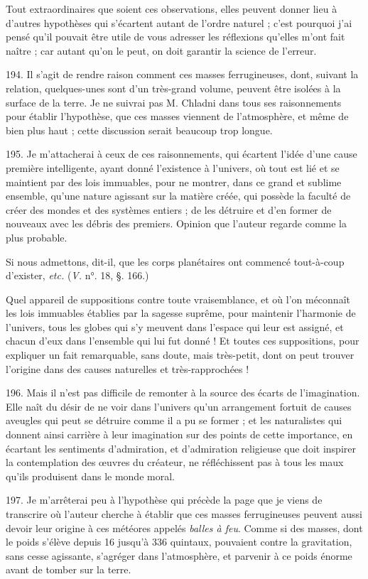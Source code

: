 \documentclass[a4paper, 11pt, oneside, polutonikogreek, french]{article}
\begin{document}
Tout extraordinaires que soient ces observations, elles peuvent donner lieu à d'autres hypothèses qui s'écartent autant de l'ordre naturel ; c'est pourquoi j'ai pensé qu'il pouvait être utile de vous adresser les réflexions qu'elles m'ont fait naître ; car autant qu'on le peut, on doit garantir la science de l'erreur.

194. Il s'agit de rendre raison comment ces masses ferrugineuses, dont, suivant la relation, quelques-unes sont d'un très-grand volume, peuvent être isolées à la surface de la terre. Je ne suivrai pas M. Chladni dans tous ses raisonnements pour établir l'hypothèse, que ces masses viennent de l'atmosphère, et même de bien plus haut ; cette discussion serait beaucoup trop longue.

195. Je m'attacherai à ceux de ces raisonnements, qui écartent l'idée d'une cause première intelligente, ayant donné l'existence à l'univers, où tout est lié et se maintient par des lois immuables, pour ne montrer, dans ce grand et sublime ensemble, \og qu'une nature agissant sur la matière créée, qui possède la faculté de créer des mondes et des systèmes entiers ; de les détruire et d'en former de nouveaux avec les débris des premiers. \fg Opinion que l'auteur regarde comme la plus probable.

\og Si nous admettons, dit-il, que les corps planétaires ont commencé tout-à-coup d'exister, \emph{etc.} \fg (\emph{V.} n°. 18, §. 166.)

Quel appareil de suppositions contre toute vraisemblance, et où l'on méconnaît les lois immuables établies par la sagesse suprême, pour maintenir l'harmonie de l'univers, tous les globes qui s'y meuvent dans l'espace qui leur est assigné, et chacun d'eux dans l'ensemble qui lui fut donné ! Et toutes ces suppositions, pour expliquer un fait remarquable, sans doute, mais très-petit, dont on peut trouver l'origine dans des causes naturelles et très-rapprochées !

196. Mais il n'est pas difficile de remonter à la source des écarts de l'imagination. Elle naît du désir de ne voir dans l'univers qu'un arrangement fortuit de causes aveugles qui peut se détruire comme il a pu se former ; et les naturalistes qui donnent ainsi carrière à leur imagination sur des points de cette importance, en écartant les sentiments d'admiration, et d'admiration religieuse que doit inspirer la contemplation des œuvres du créateur, ne réfléchissent pas à tous les maux qu'ils produisent dans le monde moral.

197. Je m'arrêterai peu à l'hypothèse qui précède la page que je viens de transcrire où l'auteur cherche à établir que ces masses ferrugineuses peuvent aussi devoir leur origine à ces météores appelés \emph{balles à feu}. Comme si des masses, dont le poids s'élève depuis 16 jusqu'à 336 quintaux, pouvaient contre la gravitation, sans cesse agissante, s'agréger dans l'atmosphère, et parvenir à ce poids énorme avant de tomber sur la terre.
\end{document}

